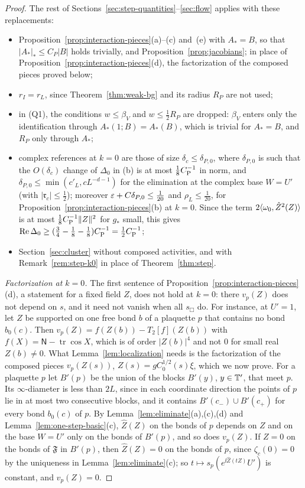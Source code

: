 \begin{proof}
The rest of Sections~\ref{sec:step-quantities}--\ref{sec:flow} applies with these replacements:
\begin{itemize}
\item Proposition~\ref{prop:interaction-pieces}(a)--(c) and~(e) with $A_*=B$, so that $|A_*|_*\le C_P|B|$ holds trivially, and Proposition~\ref{prop:jacobians}; in place of Proposition~\ref{prop:interaction-pieces}(d), the factorization of the composed pieces proved below;
\item $r_I=r_L$, since Theorem~\ref{thm:weak-bg} and its radius $R_P$ are not used;
\item in (Q1), the conditions $w\le\beta_V$ and $w\le\frac12R_P$ are dropped: $\beta_V$ enters only the identification through $A_*(1;B)=A_*(B)$, which is trivial for $A_*=B$, and $R_P$ only through $A_*$;
\item complex references at $k=0$ are those of size $\delta_c\le\delta_{P,0}$, where $\delta_{P,0}$ is such that the $O(\delta_c)$ change of $\Delta_0$ in (b) is at most $\frac18C_{\rm P}^{-1}$ in norm, and $\delta_{P,0}\le\min(c'_L,cL^{-d-1})$ for the elimination at the complex base $W=U'$ (with $|\mathfrak r_c|\le\frac12$); moreover $\varepsilon+C\delta_{P,0}\le\frac1{20}$ and $\rho_L\le\frac1{20}$, for Proposition~\ref{prop:interaction-pieces}(b) at $k=0$. Since the term $2\langle \omega_0,\hat Z^2(Z)\rangle$ is at most $\frac18C_{\rm P}^{-1}\|Z\|^2$ for $g_*$ small, this gives $\operatorname{Re}\Delta_0\ge(\frac34-\frac18-\frac18)C_{\rm P}^{-1}=\frac12C_{\rm P}^{-1}$;
\item Section~\ref{sec:cluster} without composed activities, and with Remark~\ref{rem:step-k0} in place of Theorem~\ref{thm:step}.
\end{itemize}
\emph{Factorization at $k=0$.} The first sentence of Proposition~\ref{prop:interaction-pieces}(d), a statement for a fixed field $Z$, does not hold at $k=0$: there $v_p(Z)$ does not depend on $s$, and it need not vanish when all $s_\Box$ do. For instance, at $U'=1$, let $Z$ be supported on one free bond $b$ of a plaquette $p$ that contains no bond $b_0(c)$. Then $v_p(Z)=f(Z(b))-T_2[f](Z(b))$ with $f(X)=\mathsf N-\operatorname{tr}\cos X$, which is of order $|Z(b)|^4$ and not $0$ for small real $Z(b)\ne0$. What Lemma~\ref{lem:localization} needs is the factorization of the composed pieces $v_p(Z(s))$, $Z(s)=gC_0^{1/2}(s)\xi$, which we now prove. For a plaquette $p$ let $B'(p)$ be the union of the blocks $B'(y)$, $y\in\mathbb T'$, that meet $p$. Its $\infty$-diameter is less than $2L$, since in each coordinate direction the points of $p$ lie in at most two consecutive blocks, and it contains $B'(c_-)\cup B'(c_+)$ for every bond $b_0(c)$ of $p$. By Lemma~\ref{lem:eliminate}(a),(c),(d) and Lemma~\ref{lem:one-step-basic}(c), $\hat Z(Z)$ on the bonds of $p$ depends on $Z$ and on the base $W=U'$ only on the bonds of $B'(p)$, and so does $v_p(Z)$. If $Z=0$ on the bonds of $\mathfrak F$ in $B'(p)$, then $\hat Z(Z)=0$ on the bonds of $p$, since $\zeta_c(0)=0$ by the uniqueness in Lemma~\ref{lem:eliminate}(c); so $t\mapsto s_p(e^{\ii\hat Z(tZ)}U')$ is constant, and $v_p(Z)=0$.


\end{proof}
